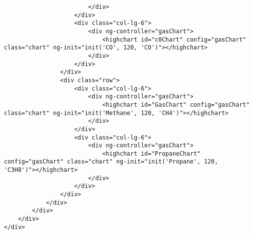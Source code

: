 \begin{verbatim}
                        </div>
                    </div>
                    <div class="col-lg-6">
                        <div ng-controller="gasChart">
                            <highchart id="c0Chart" config="gasChart" class="chart" ng-init="init('CO', 120, 'CO')"></highchart>
                        </div>
                    </div>
                </div>
                <div class="row">
                    <div class="col-lg-6">
                        <div ng-controller="gasChart">
                            <highchart id="GasChart" config="gasChart" class="chart" ng-init="init('Methane', 120, 'CH4')"></highchart>
                        </div>
                    </div>
                    <div class="col-lg-6">
                        <div ng-controller="gasChart">
                            <highchart id="PropaneChart" config="gasChart" class="chart" ng-init="init('Propane', 120, 'C3H8')"></highchart>
                        </div>
                    </div>
                </div>
            </div>
        </div>
    </div>
</div>
\end{verbatim}


